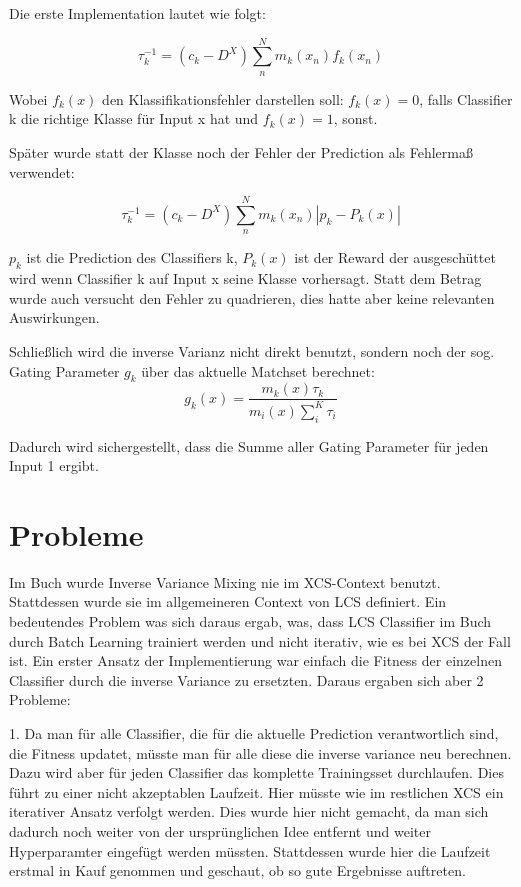 \documentclass{ocsmnar}
\begin{document}
Die erste Implementation lautet wie folgt: 

$$ \tau_{k}^{-1} = (c_{k} - D^{X}) \sum_{n}^{N} m_{k}(x_{n})f_{k}(x_{n}) $$

Wobei $f_{k}(x)$ den Klassifikationsfehler darstellen soll: $f_{k}(x) = 0$, falls Classifier k die richtige Klasse für Input x hat und $f_{k}(x) = 1$, sonst. 

Später wurde statt der Klasse noch der Fehler der Prediction als Fehlermaß verwendet:

$$ \tau_{k}^{-1} = (c_{k} - D^{X}) \sum_{n}^{N} m_{k}(x_{n}) |p_{k} - P_{k}(x)|  $$

$p_{k}$ ist die Prediction des Classifiers k, $P_{k}(x)$ ist der Reward der ausgeschüttet wird wenn Classifier k auf Input x seine Klasse vorhersagt. 
Statt dem Betrag wurde auch versucht den Fehler zu quadrieren, dies hatte aber keine relevanten Auswirkungen.

Schließlich wird die inverse Varianz nicht direkt benutzt, sondern noch der sog. Gating Parameter $g_{k}$ über das aktuelle Matchset berechnet: 
$$ g_k(x) = \frac{m_k(x)\tau_k}{m_i(x)\sum_i^K \tau_i}$$

Dadurch wird sichergestellt, dass die Summe aller Gating Parameter für jeden Input 1 ergibt. 




\section{Probleme}
Im Buch wurde Inverse Variance Mixing nie im XCS-Context benutzt. Stattdessen wurde sie im allgemeineren Context von LCS definiert. Ein bedeutendes Problem was sich daraus ergab, was, dass LCS Classifier im Buch durch Batch Learning trainiert werden und nicht iterativ, wie es bei XCS der Fall ist. 
Ein erster Ansatz der Implementierung war einfach die Fitness der einzelnen Classifier durch die inverse Variance zu ersetzten. 
Daraus ergaben sich aber 2 Probleme: 

1. Da man für alle Classifier, die für die aktuelle Prediction verantwortlich sind, die Fitness updatet, müsste man für alle diese die inverse variance neu berechnen. Dazu wird aber für jeden Classifier das komplette Trainingsset durchlaufen. Dies führt zu einer nicht akzeptablen Laufzeit. Hier müsste wie im restlichen XCS ein iterativer Ansatz verfolgt werden. Dies wurde hier nicht gemacht, da man sich dadurch noch weiter von der ursprünglichen Idee entfernt und weiter Hyperparamter eingefügt werden müssten. 
Stattdessen wurde hier die Laufzeit erstmal in Kauf genommen und geschaut, ob so gute Ergebnisse auftreten.  
\end{document}
